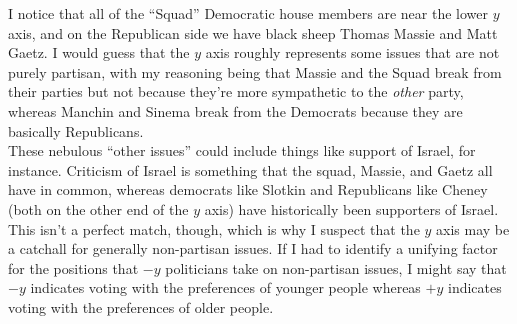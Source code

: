 \documentclass{amsart}
\begin{document}
	I notice that all of the ``Squad'' Democratic house members are near the lower $y$ axis, and on the Republican side we have black sheep Thomas Massie and Matt Gaetz. I would guess that the $y$ axis roughly represents some issues that are not purely partisan, with my reasoning being that Massie and the Squad break from their parties but not because they're more sympathetic to the \textit{other} party, whereas Manchin and Sinema break from the Democrats because they are basically Republicans.\\
	
	These nebulous ``other issues'' could include things like support of Israel, for instance. Criticism of Israel is something that the squad, Massie, and Gaetz all have in common, whereas democrats like Slotkin and Republicans like Cheney (both on the other end of the $y$ axis) have historically been supporters of Israel. This isn't a perfect match, though, which is why I suspect that the $y$ axis may be a catchall for generally non-partisan issues. If I had to identify a unifying factor for the positions that $-y$ politicians take on non-partisan issues, I might say that $-y$ indicates voting with the preferences of younger people whereas $+y$ indicates voting with the preferences of older people.
	
	
\end{document}
